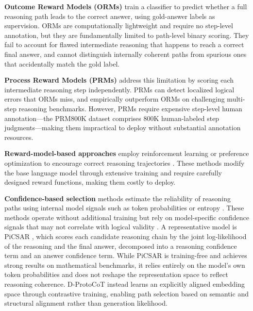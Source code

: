 \documentclass[a4paper,fleqn]{cas-dc}
\begin{document}
\textbf{Outcome Reward Models (ORMs)} \citep{cobbe2021trainingverifiers} train a classifier to predict whether a full reasoning path leads to the correct answer, using gold-answer labels as supervision.
ORMs are computationally lightweight and require no step-level annotation, but they are fundamentally limited to path-level binary scoring. They fail to account for flawed intermediate reasoning that happens to reach a correct final answer, and cannot distinguish internally coherent paths from spurious ones that accidentally match the gold label.

\textbf{Process Reward Models (PRMs)} \citep{lightman2023letsverify} address this limitation by scoring each intermediate reasoning step independently.
PRMs can detect localized logical errors that ORMs miss, and empirically outperform ORMs on challenging multi-step reasoning benchmarks.
However, PRMs require expensive step-level human annotation---the PRM800K dataset \citep{lightman2023letsverify} comprises 800K human-labeled step judgments---making them impractical to deploy without substantial annotation resources.

\textbf{Reward-model-based approaches} employ reinforcement learning or preference optimization to encourage correct reasoning trajectories \citep{ouyang2022training, bai2022constitutional}.
These methods modify the base language model through extensive training and require carefully designed reward functions, making them costly to deploy.

\textbf{Confidence-based selection} methods estimate the reliability of reasoning paths using internal model signals such as token probabilities or entropy \citep{leang2025picsar, sultan-astudillo-2025-confidence}.
These methods operate without additional training but rely on model-specific confidence signals that may not correlate with logical validity \citep{xiong2024llmsexpressuncertaintyempirical}.
A representative model is PiCSAR \citep{leang2025picsar}, which scores each candidate reasoning chain by the joint log-likelihood of the reasoning and the final answer, decomposed into a reasoning confidence term and an answer confidence term.
While PiCSAR is training-free and achieves strong results on mathematical benchmarks, it relies entirely on the model's own token probabilities and does not reshape the representation space to reflect reasoning coherence.
D-ProtoCoT instead learns an explicitly aligned embedding space through contrastive training, enabling path selection based on semantic and structural alignment rather than generation likelihood.
\end{document}
